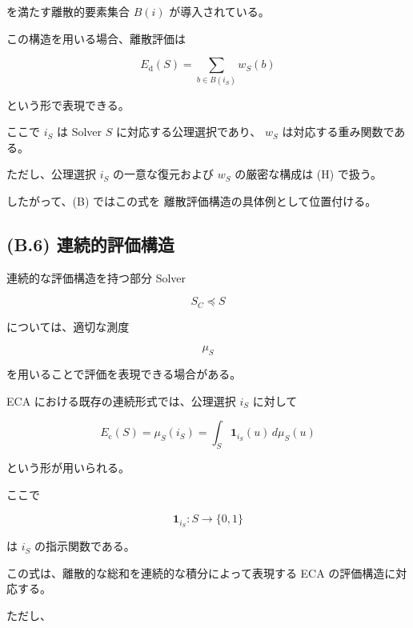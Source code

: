 \documentclass[a4paper,11pt]{article}
\newcommand{\SubSolver}{\preceq}
\begin{document}
を満たす離散的要素集合 $B(i)$ が導入されている。

この構造を用いる場合、離散評価は

\begin{equation}
    E_{\mathrm d}(S)
    =
    \sum_{b\in B(i_S)}
    w_S(b)
    \label{eq:B-discrete-evaluation}
\end{equation}

という形で表現できる。

ここで $i_S$ は Solver $S$ に対応する公理選択であり、
$w_S$ は対応する重み関数である。

ただし、公理選択 $i_S$ の一意な復元および
$w_S$ の厳密な構成は (H) で扱う。

したがって、(B) ではこの式を
離散評価構造の具体例として位置付ける。


\subsection{(B.6) 連続的評価構造}
\label{subsec:B6}

連続的な評価構造を持つ部分 Solver

\begin{equation}
    S_C\SubSolver S
\end{equation}

については、適切な測度

\begin{equation}
    \mu_S
\end{equation}

を用いることで評価を表現できる場合がある。

ECA における既存の連続形式では、公理選択 $i_S$ に対して

\begin{equation}
    E_{\mathrm c}(S)
    =
    \mu_S(i_S)
    =
    \int_S
    \mathbf{1}_{i_S}(u)
    \,d\mu_S(u)
    \label{eq:B-continuous-evaluation}
\end{equation}

という形が用いられる。

ここで

\begin{equation}
    \mathbf{1}_{i_S}:S\to\{0,1\}
\end{equation}

は $i_S$ の指示関数である。

この式は、離散的な総和を連続的な積分によって表現する
ECA の評価構造に対応する。

ただし、
\end{document}
